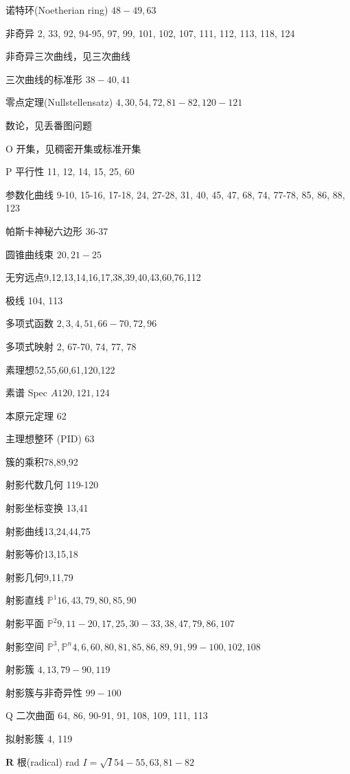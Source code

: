 诺特环(Noetherian ring) \({48} - {49},{63}\)

非奇异 2, 33, 92, 94-95, 97, 99, 101, 102, 107, 111, 112, 113, 118, 124

非奇异三次曲线，见三次曲线

三次曲线的标准形 \({38} - {40},{41}\)

零点定理(Nullstellensatz) \(4,{30},{54},{72},{81} - {82},{120} - {121}\)

数论，见丢番图问题

O 开集，见稠密开集或标准开集

P 平行性 11, 12, 14, 15, 25, 60

参数化曲线 9-10, 15-16, 17-18, 24, 27-28, 31, 40, 45, 47, 68, 74, 77-78, 85, 86, 88, 123

帕斯卡神秘六边形 36-37

圆锥曲线束 \({20},{21} - {25}\)

无穷远点9,12,13,14,16,17,38,39,40,43,60,76,112

极线 104, 113

多项式函数 \(2,3,4,{51},{66} - {70},{72},{96}\)

多项式映射 2, 67-70, 74, 77, 78

素理想52,55,60,61,120,122

素谱 Spec \({A120},{121},{124}\)

本原元定理 62

主理想整环 (PID) 63

簇的乘积78,89,92

射影代数几何 119-120

射影坐标变换 13,41

射影曲线13,24,44,75

射影等价13,15,18

射影几何9,11,79

射影直线 \({\mathbb{P}}^{1}{16},{43},{79},{80},{85},{90}\)

射影平面 \({\mathbb{P}}^{2}9,{11} - {20},{17},{25},{30} - {33},{38},{47},{79},{86},{107}\)

射影空间 \({\mathbb{P}}^{3},{\mathbb{P}}^{n}4,6,{60},{80},{81},{85},{86},{89},{91},{99} - {100},{102},{108}\)

射影簇 \(4,{13},{79} - {90},{119}\)

射影簇与非奇异性 \({99} - {100}\)

Q 二次曲面 64, 86, 90-91, 91, 108, 109, 111, 113

拟射影簇 4, 119

\(\mathbf{R}\) 根(radical) rad \(I = \sqrt{I}{54} - {55},{63},{81} - {82}\)

